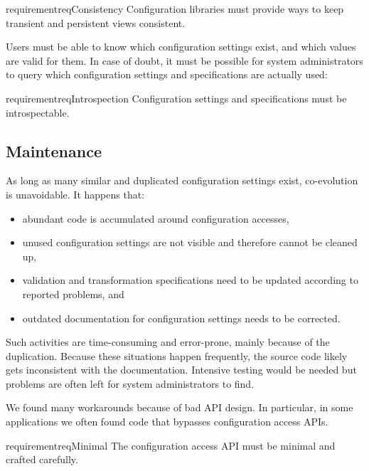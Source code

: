 \begin{restatable}{requirement}{reqConsistency}
\label{req:consistency}
Configuration libraries must provide ways to keep transient and persistent views consistent.
\end{restatable}

Users must be able to know which configuration settings exist, and which values are valid for them.
In case of doubt, it must be possible for system administrators to query which configuration settings and specifications are actually used:

\begin{restatable}{requirement}{reqIntrospection}
Configuration settings and specifications must be introspectable.%
\label{req:introspection}
\end{restatable}

\subsection{Maintenance}

As long as many similar and duplicated configuration settings exist, co-evolution is unavoidable.
It happens that:

\begin{itemize}
\item abundant code is accumulated around configuration accesses,
\item unused configuration settings are not visible and therefore cannot be cleaned up,
\item validation and transformation specifications need to be updated according to reported problems, and
\item outdated documentation for configuration settings needs to be corrected.
\end{itemize}

Such activities are time-consuming and error-prone, mainly because of the duplication.
Because these situations happen frequently, the source code likely gets inconsistent with the documentation.
Intensive testing would be needed but problems are often left for system administrators to find.

We found many workarounds because of bad API design.
In particular, in some applications we often found code that bypasses configuration access APIs.

\begin{restatable}{requirement}{reqMinimal}
The configuration access API must be minimal and crafted carefully.
\end{restatable}

